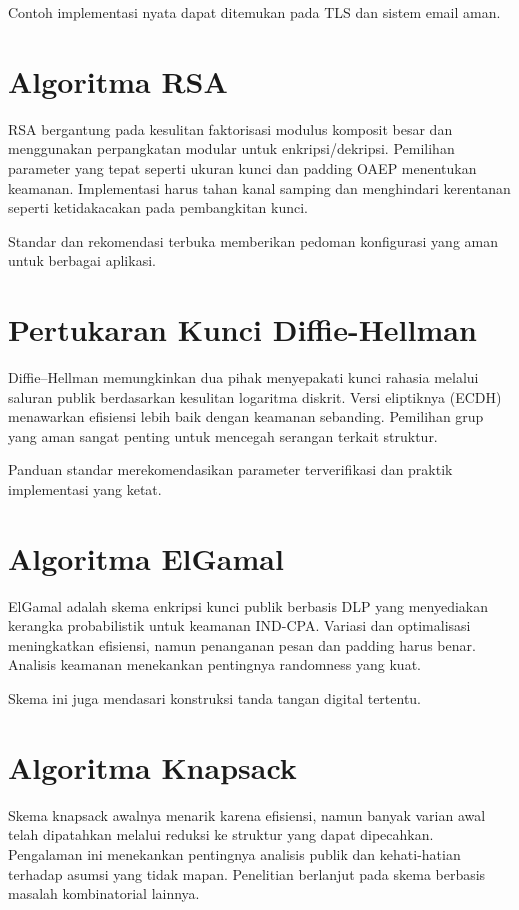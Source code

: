 \documentclass[../main.tex]{subfiles}
\begin{document}
Contoh implementasi nyata dapat ditemukan pada TLS dan sistem email aman.

\section{Algoritma RSA}
RSA bergantung pada kesulitan faktorisasi modulus komposit besar dan menggunakan perpangkatan modular untuk enkripsi/dekripsi. Pemilihan parameter yang tepat seperti ukuran kunci dan padding OAEP menentukan keamanan. Implementasi harus tahan kanal samping dan menghindari kerentanan seperti ketidakacakan pada pembangkitan kunci.

Standar dan rekomendasi terbuka memberikan pedoman konfigurasi yang aman untuk berbagai aplikasi.

\section{Pertukaran Kunci Diffie-Hellman}
Diffie--Hellman memungkinkan dua pihak menyepakati kunci rahasia melalui saluran publik berdasarkan kesulitan logaritma diskrit. Versi eliptiknya (ECDH) menawarkan efisiensi lebih baik dengan keamanan sebanding. Pemilihan grup yang aman sangat penting untuk mencegah serangan terkait struktur.

Panduan standar merekomendasikan parameter terverifikasi dan praktik implementasi yang ketat.

\section{Algoritma ElGamal}
ElGamal adalah skema enkripsi kunci publik berbasis DLP yang menyediakan kerangka probabilistik untuk keamanan IND-CPA. Variasi dan optimalisasi meningkatkan efisiensi, namun penanganan pesan dan padding harus benar. Analisis keamanan menekankan pentingnya randomness yang kuat.

Skema ini juga mendasari konstruksi tanda tangan digital tertentu.

\section{Algoritma Knapsack}
Skema knapsack awalnya menarik karena efisiensi, namun banyak varian awal telah dipatahkan melalui reduksi ke struktur yang dapat dipecahkan. Pengalaman ini menekankan pentingnya analisis publik dan kehati-hatian terhadap asumsi yang tidak mapan. Penelitian berlanjut pada skema berbasis masalah kombinatorial lainnya.
\end{document}
